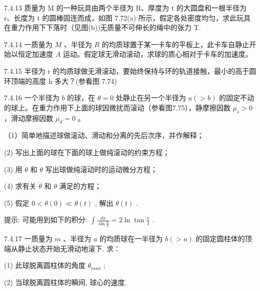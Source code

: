 \begin{problem}{7.4.13}
质量为 M 的一种玩具由两个半径为 R、厚度为 t 的大圆盘和一根半径为 r、长度为 t 的圆棒固连而成，如图 7.72(a) 所示，假定各处密度均匀，求此玩具在重力作用下下落时（见图(b))无质量不可伸长的绳中的张力 T.
\begin{center}

\end{center}
\end{problem}
\clearpage


\begin{problem}{7.4.14}
一质量为 $M$ 、半径为 $R$ 的均质球置于某一卡车的平板上，此卡车自静止开始以恒定加速度 $A$ 运动。假定球无滑动滚动，求球的质心相对于卡车的加速度。
\end{problem}
\clearpage


\begin{problem}{7.4.15}
半径为 r 的均质球做无滑滚动，要始终保持与环的轨道接触，最小的高于圆环顶端的高度 h 多大？(参看图 7.74)
\begin{center}

\end{center}
\end{problem}
\clearpage


\begin{problem}{7.4.16}
一个半径为 $b$ 的球，在 $\theta = 0$ 处静止在另一个半径为 $a (> b)$ 的固定不动的球上。在重力作用下上面的球因微扰而滚动（参看图7.75），静摩擦因数 $\mu_s > 0$ ，滑动摩擦因数 $\mu_d = 0$ 。

（1）简单地描述球做滚动、滑动和分离的先后次序，并作解释；

(2) 写出上面的球在下面的球上做纯滚动的约束方程；

(3) 用 $\ddot{\theta}$ 和 $\theta$ 写出球做纯滚动时的运动微分方程；

(4) 求有关 $\ddot{\theta}$ 和 $\theta$ 满足的方程；

(5) 假定 $0 < \theta(0) \ll \theta(t)$ , 解出 $\theta(t)$ .

提示: 可能用到如下的积分: $\int \frac{dx}{\sin \frac{x}{2}} = 2 \ln \tan \frac{x}{4}$ .
\begin{center}

\end{center}
\end{problem}
\clearpage


\begin{problem}{7.4.17}
一质量为 $m$ 、半径为 $a$ 的均质球在一半径为 $b (>a)$ 的固定圆柱体的顶端从静止状态开始无滑动地滚下. 求：

(1) 此球脱离圆柱体的角度 $\theta_{max}$ ;

(2) 当球脱离圆柱体的瞬间, 球心的速度.
\begin{center}

\end{center}
\end{problem}
\clearpage


